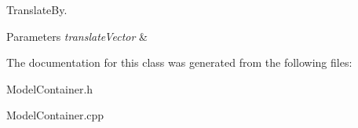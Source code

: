 Translate\+By. 


\begin{DoxyParams}{Parameters}
{\em translate\+Vector} & \\
\hline
\end{DoxyParams}


The documentation for this class was generated from the following files\+:\begin{DoxyCompactItemize}
\item 
Model\+Container.\+h\item 
Model\+Container.\+cpp\end{DoxyCompactItemize}
